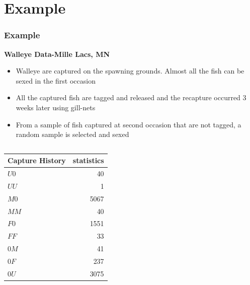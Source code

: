 \documentclass{beamer}
\begin{document}
\section{Example}
\begin{frame} \frametitle{Example}
\textbf{{\scriptsize  Walleye Data-Mille Lacs, MN} }
\vspace{3pt}

{\tiny  
\begin{itemize}
\item Walleye are captured on the spawning grounds. Almost all the fish can be sexed in the first occasion
\item All the captured fish are tagged and released and the recapture occurred 3 weeks later using gill-nets
\item From a sample of fish captured at second occasion that are not tagged, a random sample is selected and sexed
\end{itemize} 
}


\begin{columns}

{\scriptsize 
\begin{table}
\centering 
\begin{tabular}{ |l|r| } 
\hline
  Capture History & statistics \\ \hline
  $U0$ & 40 \\ \hline
  $UU$ & 1 \\ \hline
  $M0$ & 5067 \\ \hline
  $MM$ & 40 \\ \hline
  $F0$ & 1551 \\ \hline
  $FF$ & 33 \\ \hline
  $0M$ & 41 \\ \hline
  $0F$ & 237 \\ \hline
  $0U$ & 3075 \\ \hline
\end{tabular}
\end{table}
}

\vspace{16pt}


\end{columns}
\end{frame}
\end{document}
